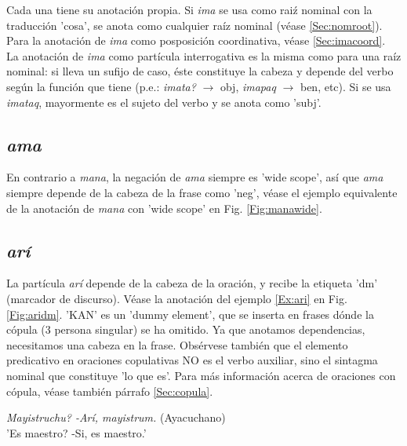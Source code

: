 \documentclass[a4paper,11pt,DIV12]{scrartcl}
\begin{document}
Cada una tiene su anotaci\'on propia. Si {\em ima} se usa como rai\'z nominal con la traducci\'on 'cosa', se anota como cualquier ra\'iz nominal (v\'ease \ref{Sec:nomroot}).\\
Para la anotaci\'on de {\em ima} como posposici\'on coordinativa, v\'ease \ref{Sec:imacoord}.\\
La anotaci\'on de {\em ima} como part\'icula interrogativa es la misma como para una ra\'iz nominal: si lleva un sufijo de caso, \'este constituye la cabeza y depende del verbo seg\'un la funci\'on que tiene (p.e.: {\em imata?} $\rightarrow$ obj, {\em imapaq} $\rightarrow$ ben, etc). Si se usa {\em imataq}, mayormente es el sujeto del verbo y se anota como 'subj'. 


  \subsection{{\em ama}}
En contrario a {\em mana}, la negaci\'on de {\em ama} siempre es 'wide scope', as\'i que {\em ama} siempre depende de la cabeza de la frase como 'neg', v\'ease el ejemplo equivalente de la anotaci\'on de {\em mana} con 'wide scope' en Fig. \ref{Fig:manawide}.


  \subsection{{\em ar\'i}}\label{Sec:ari}
La part\'icula {\em ar\'i} depende de la cabeza de la oraci\'on, y recibe la etiqueta 'dm' (marcador de discurso). V\'ease la anotaci\'on del ejemplo \ref{Ex:ari} en Fig. \ref{Fig:aridm}. 'KAN' es un 'dummy element', que se inserta en frases d\'onde la c\'opula (3{\textordfeminine} persona singular) se ha omitido. Ya que anotamos dependencias, necesitamos una cabeza en la frase. Obs\'ervese tambi\'en que el elemento predicativo en oraciones copulativas NO es el verbo auxiliar, sino el sintagma nominal que constituye 'lo que es'. Para m\'as informaci\'on acerca de oraciones con c\'opula, v\'ease tambi\'en p\'arrafo \ref{Sec:copula}.

\begin{examples}
\item\label{Ex:ari}  {\em Mayistruchu? -Ar\'i, mayistrum.} (Ayacuchano)\\
      '{\textquestiondown}Es maestro? -Si, es maestro.'\\
      	\hfill{\small \citep[16]{Dedenbach02}}
\end{examples}
\end{document}
